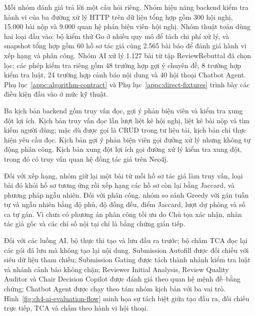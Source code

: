 Mỗi nhóm đánh giá trả lời một câu hỏi riêng. Nhóm hiệu năng backend kiểm tra hành vi của ba đường xử lý HTTP trên dữ liệu tổng hợp gồm 300 hội nghị, 15.000 bài nộp và 9.000 quan hệ phản biện viên--hội nghị. Nhóm thuật toán dùng hai loại đầu vào: bộ kiểm thử Go ở nhiều quy mô để tách chi phí xử lý, và snapshot tổng hợp gồm 60 hồ sơ tác giả cùng 2.565 bài báo để đánh giá hành vi xếp hạng và phân công. Nhóm AI xử lý 1.127 bài từ tập ReviewRebuttal đã chọn lọc; các phép kiểm tra riêng gồm 48 trường hợp gợi ý chuyên đề, 8 trường hợp kiểm tra luật, 24 trường hợp cảnh báo nội dung và 40 hội thoại Chatbot Agent. Phụ lục~\ref{appc:algorithm-contract} và Phụ lục~\ref{appc:direct-fixtures} trình bày các điều kiện đầu vào ở mức kỹ thuật.

Ba kịch bản backend gồm truy vấn đọc, gợi ý phản biện viên và kiểm tra xung đột lợi ích. Kịch bản truy vấn đọc lần lượt liệt kê hội nghị, liệt kê bài nộp và tìm kiếm người dùng; mặc dù được gọi là CRUD trong tư liệu tải, kịch bản chỉ thực hiện yêu cầu đọc. Kịch bản gợi ý phản biện viên gọi đường xử lý  nhưng không tự động phân công. Kịch bản xung đột lợi ích gọi đường xử lý kiểm tra xung đột, trong đó có truy vấn quan hệ đồng tác giả trên Neo4j.

Đối với xếp hạng, nhóm giữ lại một bài từ mỗi hồ sơ tác giả làm truy vấn, loại bài đó khỏi hồ sơ tương ứng rồi xếp hạng các hồ sơ còn lại bằng Jaccard,  và phương pháp ngẫu nhiên. Đối với phân công, nhóm so sánh Greedy với gán tuần tự và ngẫu nhiên bằng độ phủ, độ đồng đều, điểm Jaccard, lượt dự phòng và số ca tự gán. Vì chưa có phương án phân công tối ưu do Chủ tọa xác nhận, nhãn tác giả gốc và các chỉ số nội tại chỉ là bằng chứng gián tiếp.

Đối với các luồng AI, bộ thực thi tạo và lưu đầu ra trước; bộ chấm TCA đọc lại các gói đã lưu mà không tạo lại nội dung. Submission Autofill được đối chiếu với siêu dữ liệu tham chiếu; Submission Gating được tách thành nhánh kiểm tra luật và nhánh cảnh báo không chặn; Reviewer Initial Analysis, Review Quality Auditor và Chair Decision Copilot được đánh giá theo quan hệ mệnh đề--bằng chứng; Chatbot Agent được chạy theo tám nhóm kịch bản với ba vai trò. Hình~\ref{fig:ch4-ai-evaluation-flow} minh họa sự tách biệt giữa tạo đầu ra, đối chiếu trực tiếp, TCA và chấm theo hành vi hội thoại.

